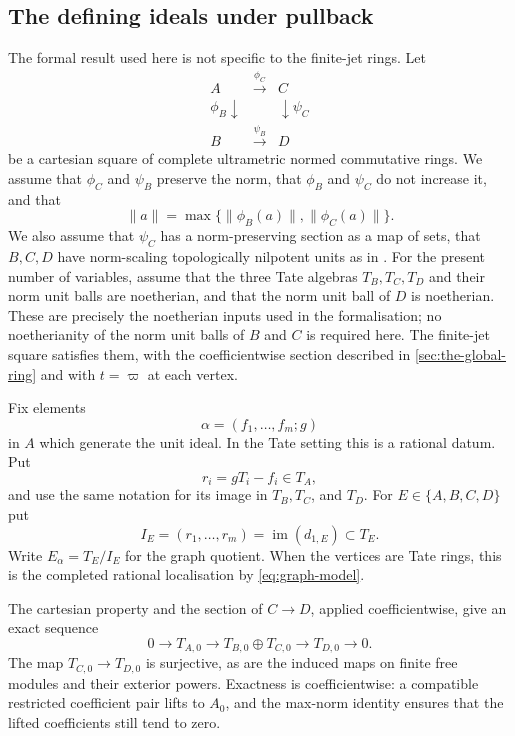 \documentclass[11pt,reqno]{amsart}
\theoremstyle{definition}
\newcommand{\im}{\operatorname{im}}
\begin{document}
\subsection{The defining ideals under pullback}

The formal result used here is not specific to the finite-jet rings.  Let
\[
\begin{matrix}
A&\xrightarrow{\phi_C}&C\\
\scriptstyle\phi_B\downarrow&&\downarrow\scriptstyle\psi_C\\
B&\xrightarrow{\psi_B}&D
\end{matrix}
\]
be a cartesian square of complete ultrametric normed commutative rings.  We
assume that $\phi_C$ and $\psi_B$ preserve the norm, that $\phi_B$ and
$\psi_C$ do not increase it, and that
\[
  \lVert a\rVert=\max\{\lVert\phi_B(a)\rVert,
                         \lVert\phi_C(a)\rVert\}.
\]
We also assume that $\psi_C$ has a norm-preserving section as a map of sets,
that $B,C,D$ have norm-scaling topologically nilpotent units as in
.  For the present number of variables, assume that the
three Tate algebras $T_B,T_C,T_D$ and their norm unit balls are noetherian,
and that the norm unit ball of $D$ is noetherian.  These are precisely the
noetherian inputs used in the formalisation; no noetherianity of the norm unit
balls of $B$ and $C$ is required here.  The finite-jet square satisfies
them, with the coefficientwise section described in \cref{sec:the-global-ring}
and with $t=\varpi$ at each vertex.

Fix elements
\[
  \alpha=(f_1,\dots,f_m;g)
\]
in $A$ which generate the unit ideal.  In the Tate setting this is a rational
datum.  Put
\[
  r_i=gT_i-f_i\in T_A,
\]
and use the same notation for its image in $T_B,T_C$, and $T_D$.  For
$E\in\{A,B,C,D\}$ put
\[
  I_E=(r_1,\ldots,r_m)=\im(d_{1,E})\subset T_E.
\]
Write $E_\alpha=T_E/I_E$ for the graph quotient.  When the vertices are Tate
rings, this is the completed rational localisation by \eqref{eq:graph-model}.

The cartesian property and the section of $C\to D$, applied coefficientwise,
give an exact sequence
\begin{equation}\label{eq:tate-ambient}
  0\longrightarrow T_{A,0}\longrightarrow
  T_{B,0}\oplus T_{C,0}\longrightarrow T_{D,0}\longrightarrow 0.
\end{equation}
The map $T_{C,0}\to T_{D,0}$ is surjective, as are the induced maps on
finite free modules and their exterior powers.  Exactness is coefficientwise:
a compatible restricted coefficient pair lifts to $A_0$, and the max-norm
identity ensures that the lifted coefficients still tend to zero.
\end{document}
